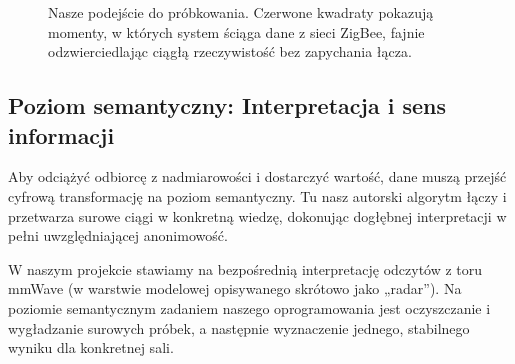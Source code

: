 \documentclass[14pt,a4paper]{extarticle}
\begin{document}
\begin{figure}[H]
    \centering
    \caption{Nasze podejście do próbkowania. Czerwone kwadraty pokazują momenty, w których system ściąga dane z sieci ZigBee, fajnie odzwierciedlając ciągłą rzeczywistość bez zapychania łącza.}
    \label{fig:probkowanie}
\end{figure}
\subsection{Poziom semantyczny: Interpretacja i sens informacji}

Aby odciążyć odbiorcę z nadmiarowości i dostarczyć wartość, dane muszą przejść cyfrową transformację na poziom semantyczny. Tu nasz autorski algorytm łączy i przetwarza surowe ciągi w konkretną wiedzę, dokonując dogłębnej interpretacji w pełni uwzględniającej anonimowość.

W naszym projekcie stawiamy na bezpośrednią interpretację odczytów z toru mmWave (w warstwie modelowej opisywanego skrótowo jako „radar”). Na poziomie semantycznym zadaniem naszego oprogramowania jest oczyszczanie i wygładzanie surowych próbek, a następnie wyznaczenie jednego, stabilnego wyniku dla konkretnej sali.
\end{document}

